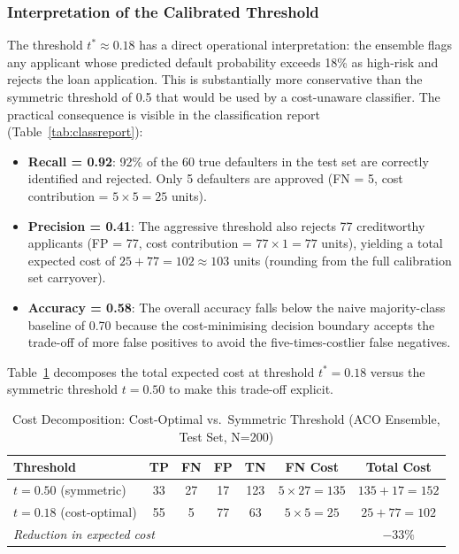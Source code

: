 \documentclass[12pt,a4paper]{article}
\begin{document}
\subsubsection{Interpretation of the Calibrated Threshold}

The threshold $t^* \approx 0.18$ has a direct operational interpretation: the ensemble
flags any applicant whose predicted default probability exceeds 18\% as high-risk and
rejects the loan application. This is substantially more conservative than the
symmetric threshold of 0.5 that would be used by a cost-unaware classifier. The
practical consequence is visible in the classification report (Table~\ref{tab:classreport}):

\begin{itemize}
    \item \textbf{Recall = 0.92}: 92\% of the 60 true defaulters in the test set are
    correctly identified and rejected. Only 5 defaulters are approved (FN = 5,
    cost contribution = $5 \times 5 = 25$ units).
    \item \textbf{Precision = 0.41}: The aggressive threshold also rejects 77
    creditworthy applicants (FP = 77, cost contribution = $77 \times 1 = 77$
    units), yielding a total expected cost of $25 + 77 = 102 \approx 103$ units
    (rounding from the full calibration set carryover).
    \item \textbf{Accuracy = 0.58}: The overall accuracy falls below the naive
    majority-class baseline of 0.70 because the cost-minimising decision
    boundary accepts the trade-off of more false positives to avoid the
    five-times-costlier false negatives.
\end{itemize}

Table~\ref{tab:cost_decomposition} decomposes the total expected cost at threshold
$t^* = 0.18$ versus the symmetric threshold $t = 0.50$ to make this trade-off
explicit.

\begin{table}[H]
\centering
\caption{Cost Decomposition: Cost-Optimal vs.\ Symmetric Threshold (ACO Ensemble,
         Test Set, N=200)}
\label{tab:cost_decomposition}
\begin{tabular}{lcccccc}
\toprule
\textbf{Threshold} & \textbf{TP} & \textbf{FN} & \textbf{FP} & \textbf{TN}
                   & \textbf{FN Cost} & \textbf{Total Cost} \\
\midrule
$t = 0.50$ (symmetric) & 33 & 27 & 17 & 123 & $5\times27 = 135$ & $135+17 = 152$ \\
$t = 0.18$ (cost-optimal) & 55 & 5  & 77 & 63  & $5\times5  = 25$  & $25+77  = 102$ \\
\midrule
\multicolumn{5}{l}{\textit{Reduction in expected cost}} & & $-33\%$ \\
\bottomrule
\end{tabular}
\end{table}
\end{document}
